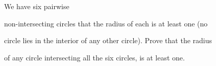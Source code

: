 We have six pairwise 

non-intersecting circles that the radius of each is at least one (no 

circle lies in the interior of any other circle). Prove that the radius 

of any circle intersecting all the six circles, is at least one.